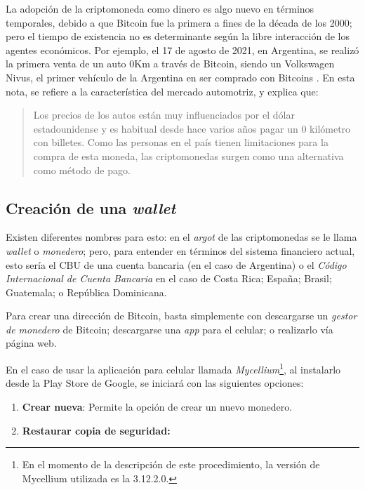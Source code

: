 \documentclass[12pt,a4paper,twoside]{book}
\begin{document}
La adopción de la criptomoneda como dinero es algo nuevo en términos temporales, debido a que Bitcoin fue la primera a fines de la década de los 2000; pero el tiempo de existencia no es determinante según la libre interacción de los agentes económicos. Por ejemplo, el 17 de agosto de 2021, en Argentina, se realizó la primera venta de un auto 0Km a través de Bitcoin, siendo un Volkswagen Nivus, el primer vehículo de la Argentina en ser comprado con Bitcoins \cite{infobae:auto0kmbitcoin}. En esta nota, se refiere a la característica del mercado automotriz, y explica que:

\begin{quotation}
Los precios de los autos están muy influenciados por el dólar estadounidense y es habitual desde hace varios años pagar un 0 kilómetro con billetes. Como las personas en el país tienen limitaciones para la compra de esta moneda, las criptomonedas surgen como una alternativa como método de pago. \cite{infobae:auto0kmbitcoin}
\end{quotation}

\subsection{Creación de una \textit{wallet}}
Existen diferentes nombres para esto: en el \textit{argot} de las criptomonedas se le llama \textit{wallet} o \textit{monedero}; pero, para entender en términos del sistema financiero actual, esto sería el CBU de una cuenta bancaria (en el caso de Argentina) o el \textit{Código Internacional de Cuenta Bancaria} en el caso de Costa Rica; España; Brasil; Guatemala; o República Dominicana.

Para crear una dirección de Bitcoin, basta simplemente con descargarse un \textit{gestor de monedero} de Bitcoin; descargarse una \textit{app} para el celular; o realizarlo vía página web.

En el caso de usar la aplicación para celular llamada \textit{Mycellium}\footnote{En el momento de la descripción de este procedimiento, la versión de Mycellium utilizada es la 3.12.2.0.}, al instalarlo desde la Play Store de Google, se iniciará con las siguientes opciones:

\begin{enumerate}
\item \textbf{Crear nueva}: Permite la opción de crear un nuevo monedero.
\item \textbf{Restaurar copia de seguridad:} 
\end{enumerate}
\end{document}
